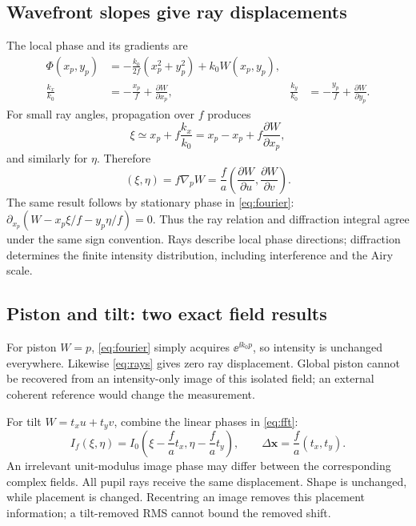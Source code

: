 \subsection{Wavefront slopes give ray displacements}
The local phase and its gradients are
\begin{align}
\Phi(x_p,y_p)&=-\frac{k_0}{2f}(x_p^2+y_p^2)+k_0W(x_p,y_p),\\
\frac{k_x}{k_0}&=-\frac{x_p}{f}+\frac{\partial W}{\partial x_p},&
\frac{k_y}{k_0}&=-\frac{y_p}{f}+\frac{\partial W}{\partial y_p}.
\end{align}
For small ray angles, propagation over $f$ produces
\begin{equation}
\xi\simeq x_p+f\frac{k_x}{k_0}
=x_p-x_p+f\frac{\partial W}{\partial x_p},
\end{equation}
and similarly for $\eta$. Therefore
\begin{equation}
\boxed{(\xi,\eta)=f\nabla_pW
=\frac{f}{a}\left(\frac{\partial W}{\partial u},\frac{\partial W}{\partial v}\right).}
\label{eq:rays}
\end{equation}
The same result follows by stationary phase in \eqref{eq:fourier}:
$\partial_{x_p}(W-x_p\xi/f-y_p\eta/f)=0$.
Thus the ray relation and diffraction integral agree under the same sign convention. Rays describe local phase directions; diffraction determines the finite intensity distribution, including interference and the Airy scale.


\subsection{Piston and tilt: two exact field results}
For piston $W=p$, \eqref{eq:fourier} simply acquires $\ee^{\ii k_0p}$, so intensity is unchanged everywhere. Likewise \eqref{eq:rays} gives zero ray displacement. Global piston cannot be recovered from an intensity-only image of this isolated field; an external coherent reference would change the measurement.

For tilt $W=t_xu+t_yv$, combine the linear phases in \eqref{eq:fft}:
\begin{equation}
\boxed{I_f(\xi,\eta)=I_0\!\left(\xi-\frac{f}{a}t_x,
\eta-\frac{f}{a}t_y\right),\qquad
\Delta\mathbf x=\frac{f}{a}(t_x,t_y).}
\label{eq:tiltphysical}
\end{equation}
An irrelevant unit-modulus image phase may differ between the corresponding complex fields. All pupil rays receive the same displacement. Shape is unchanged, while placement is changed. Recentring an image removes this placement information; a tilt-removed RMS cannot bound the removed shift.

